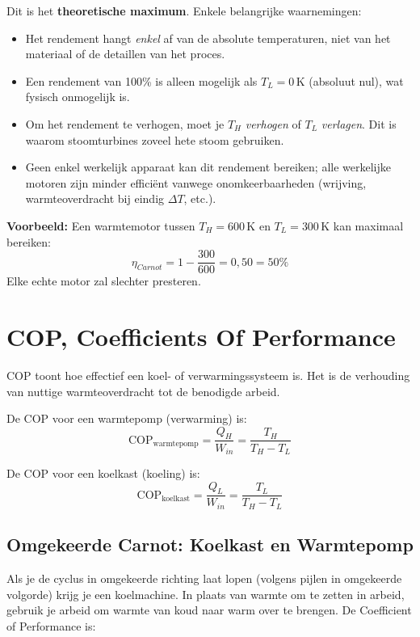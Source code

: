 \documentclass[a4paper,11pt,twoside]{report}
\begin{document}
Dit is het \textbf{theoretische maximum}. Enkele belangrijke waarnemingen:
\begin{itemize}
    \item Het rendement hangt \textit{enkel} af van de absolute temperaturen, 
    niet van het materiaal of de detaillen van het proces.
    \item Een rendement van 100\% is alleen mogelijk 
    als $T_L = 0\,\mathrm{K}$ (absoluut nul), wat fysisch onmogelijk is.
    \item Om het rendement te verhogen, 
    moet je $T_H$ \textit{verhogen} of $T_L$ \textit{verlagen}. 
    Dit is waarom stoomturbines zoveel hete stoom gebruiken.
    \item Geen enkel werkelijk apparaat kan dit rendement bereiken; 
    alle werkelijke motoren zijn minder efficiënt vanwege onomkeerbaarheden (wrijving, warmteoverdracht bij eindig $\Delta T$, etc.).
\end{itemize}

\textbf{Voorbeeld:} Een warmtemotor tussen $T_H = 600\,\mathrm{K}$ en $T_L = 300\,\mathrm{K}$ kan maximaal bereiken:
\[
\eta_{Carnot} = 1 - \frac{300}{600} = 0{,}50 = 50\%
\]
Elke echte motor zal slechter presteren.


\section{COP, Coefficients Of Performance}

COP toont hoe effectief een koel- of verwarmingssysteem is.
 Het is de verhouding van nuttige warmteoverdracht tot de benodigde arbeid.

 De COP voor een warmtepomp (verwarming) is:
\[
\mathrm{COP}_{\mathrm{warmtepomp}} = \frac{Q_H}{W_{in}} = \frac{T_H}{T_H - T_L}
\]


 De COP voor een koelkast (koeling) is:
\[\mathrm{COP}_{\mathrm{koelkast}} = \frac{Q_L}{W_{in}} = \frac{T_L}{T_H - T_L}\]


\subsection*{Omgekeerde Carnot: Koelkast en Warmtepomp}

Als je de cyclus in omgekeerde richting laat lopen 
(volgens pijlen in omgekeerde volgorde) 
krijg je een koelmachine. In plaats van warmte om te zetten in arbeid,
 gebruik je arbeid om warmte van koud naar warm over te brengen. 
 De Coefficient of Performance is:
\end{document}
